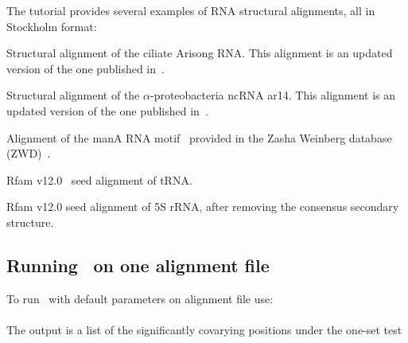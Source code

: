 The tutorial provides several examples of RNA structural
alignments, all in Stockholm format:

\begin{sreitems}{}
\item[\emprog{updated\_Arisong.sto}] Structural alignment of the ciliate
  Arisong RNA. This alignment is an updated
  version of the one published in~\citep{JungEddy11}.
\item[\emprog{ar14.sto}] Structural alignment of the $\alpha$-proteobacteria ncRNA ar14. This alignment is an updated version of the one
  published in~\citep{delVal12}.
\item[\emprog{manA.sto}] Alignment of the manA RNA motif~\citep{Weinberg09,Weinberg10} provided in the Zasha Weinberg database (ZWD)~\citep{ZWD18}.
\item[\emprog{RF00005.sto}] Rfam v12.0~\citep{Nawrocki15} seed alignment of tRNA. 
\item[\emprog{RF00001-noss.sto}] Rfam v12.0 seed alignment of 5S rRNA, after removing the consensus secondary structure. 
\end{sreitems}


\subsection{Running \rscape\, on one alignment file}
To run \rscape\ with default parameters on alignment file
 use:\\

\\

\noindent
The output is a list of the significantly covarying positions under the one-set test

